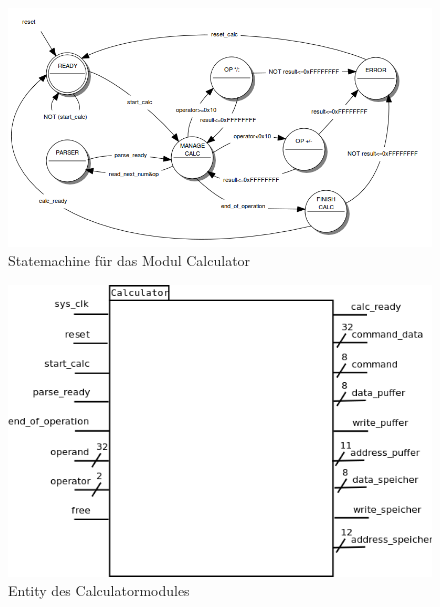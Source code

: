 \begin{figure}[!ht]
	\centering
	\includegraphics[scale=0.5]{figures/Calculator.png} 
	\caption{Statemachine für das Modul Calculator}
	\label{fig:calculator}
\end{figure}

\begin{figure}[!ht]
	\centering
	\includegraphics[scale=0.5]{figures/entity_calculator.png} 
	\caption{Entity des Calculatormodules}
	\label{fig:entity_calc}
\end{figure}

